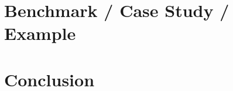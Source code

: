 \section{Benchmark / Case Study / Example}

\begin{comment}

\clearpage
\end{comment}
\section{Conclusion}
\begin{comment}



\end{comment}











































\clearemptydoublepage

\appendix
% 
% 
% 

\clearemptydoublepage





